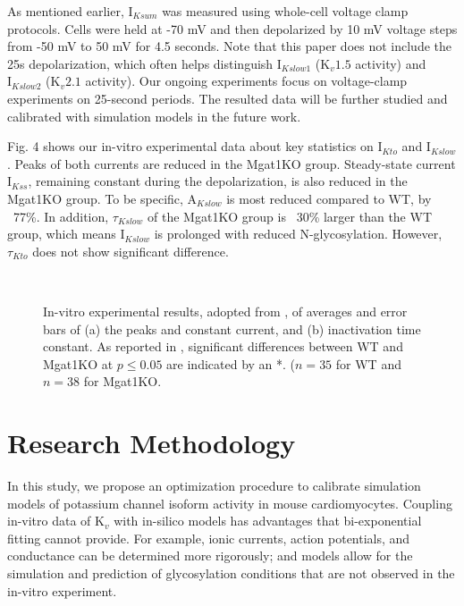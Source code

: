 \documentclass[journal]{IEEEtran}
\begin{document}
As mentioned earlier, $\text{I}_{Ksum}$ was measured using whole-cell voltage clamp protocols. Cells were held at -70 mV and then depolarized by 10 mV voltage steps from -50 mV to 50 mV for 4.5 seconds. Note that this paper does not include the 25s depolarization, which often helps distinguish $\text{I}_{Kslow1}$ ($\text{K}_{v}1.5$ activity) and $\text{I}_{Kslow2}$ ($\text{K}_{v}2.1$ activity). Our ongoing experiments focus on voltage-clamp experiments on 25-second periods. The resulted data will be further studied and calibrated with simulation models in the future work.

Fig. 4 shows our in-vitro experimental data about key statistics on $\text{I}_{Kto}$ and $\text{I}_{Kslow}$. Peaks of both currents are reduced in the Mgat1KO group. Steady-state current $\text{I}_{Kss}$, remaining constant during the depolarization, is also reduced in the Mgat1KO group. To be specific, $\text{A}_{Kslow}$ is most reduced compared to WT, by ~77\%. In addition, $\tau_{Kslow}$ of the Mgat1KO group is ~30\% larger than the WT group, which means $\text{I}_{Kslow}$ is prolonged with reduced N-glycosylation. However, $\tau_{Kto}$ does not show significant difference.
\begin{figure}
    \label{fig4}
    \centering
    \\
    \caption{In-vitro experimental results, adopted from \cite{ednie2019reduced}, of averages and error bars of (a) the peaks and constant current, and (b) inactivation time constant. As reported in \cite{ednie2019reduced}, significant differences between WT and Mgat1KO at $p \leq 0.05$ are indicated by an *. ($n=35$ for WT and $n=38$ for Mgat1KO.}
\end{figure}

\section{Research Methodology}
In this study, we propose an optimization procedure to calibrate simulation models of potassium channel isoform activity in mouse cardiomyocytes. Coupling in-vitro data of $\text{K}_{v}$ with in-silico models has advantages that bi-exponential fitting cannot provide. For example, ionic currents, action potentials, and conductance can be determined more rigorously; and models allow for the simulation and prediction of glycosylation conditions that are not observed in the in-vitro experiment. 
\end{document}
